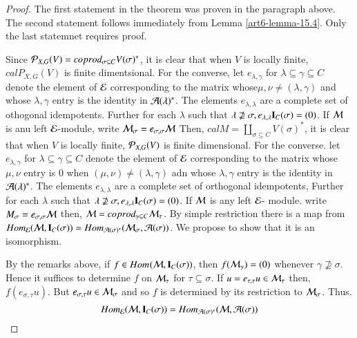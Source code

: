 \begin{proof}
The first statement in the theorem was proven in the paragraph above. The second statement follows immediately from Lemma \ref{art6-lemma-15.4}. Only the last statemnet requires proof.

Since $\mathcal{P}_{X, G}(V) = coprod_{\sigma \subseteq C}V(\sigma)^{*}$, it is clear that when $V$ is locally finite, $calP_{X, G}(V)$ is finite dimentsional. For the converse, let $e_{\lambda, \gamma}$ for $\lambda \subseteq \gamma \subseteq C$ denote the element of $\mathcal{E}$ corresponding to the matrix whose$ \mu, \nu \neq (\lambda, \gamma)$ and whose $\lambda, \gamma$ entry is the identity in $\mathcal{A}(\lambda)^{*}$. The elements $e_{\lambda, \lambda}$ are a complete set of othogonal idempotents. Further for each  $\lambda$ such that $\lambda \nsupseteq \sigma, e_{\lambda, \lambda}\mathbf{I}_{C}(\sigma) = (0)$. If $\mathcal{M}$ is anu left $\mathcal{E}$-module, write $\mathcal{M}_{\sigma} = e_{\sigma, \sigma}\mathcal{M}$ Then, $calM= \coprod_{\sigma \subseteq C}V(\sigma)^{*}$, it is clear that when $V$ is locally finite, $\mathcal{P}_{X, G}(V)$ is finite dimensional. For the converse. let $e_{\lambda, \gamma}$ for $\lambda\subseteq \gamma \subseteq C$ denote the element of $\mathcal{E}$ corresponding to the matrix whose $\mu, \nu$ entry is $0$ when $(\mu, \nu) \neq (\lambda, \gamma)$ adn whose $\lambda,\gamma$ entry is the identity in $\mathcal{A}(\lambda)^{*}$. The elements $e_{\lambda, \lambda}$ are a complete set of orthogonal idempotents, Further for each $\lambda$ such that $\lambda \nsupseteq \sigma, e_{\lambda, \lambda}\mathbf{I}_{C}(\sigma) = (0)$. If $\mathcal{M}$ is any left $\mathcal{E}$- module. write $M_{\sigma}= e_{\sigma, \sigma}\mathcal{M}$ then, $\mathcal{M} = coprod_{\gamma \subseteq C}\mathcal{M}_{\tau}$. By simple restriction there is a map from $Hom_{\mathcal{E}}(\mathcal{M}, \mathbf{I}_{C}(\sigma))= Hom_{\mathcal{A}(\sigma)^{*}}(\mathcal{M}_{\sigma}, \mathcal{A}(\sigma))$. We propose to show that it is an isomorphism.

By the remarks above, if $ f \in Hom_{\cal}(\mathcal{M}, \mathbf{I}_{C}(\sigma))$, then $f(\mathcal{M}_{\gamma}) = (0)$ whenever $\gamma \nsupseteq \sigma$. Hence it suffices to determine $f$ on $\mathcal{M}_{\tau}$ for $\tau \subseteq \sigma$. If $u=e_{\tau, \tau}u \in \mathcal{M}_{\tau}$ then, $f(e_{\sigma, \tau} u)$. But $e_{\sigma, \tau}u \in \mathcal{M}_{\sigma}$ and so $f$ is determined by its restriction to $\mathcal{M}_{\sigma}$. Thus.
\begin{equation}\label{art6-eq-15.8}
Hom_{\mathcal{E}}(\mathcal{M}, \mathbf{I}_{C}(\sigma)) = Hom_{\mathcal{A}(\sigma)^{*}}(\mathcal{M}, \mathcal{A}(\sigma))
\end{equation}


\end{proof}
